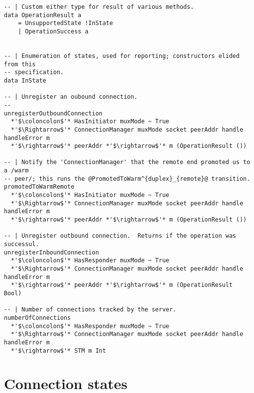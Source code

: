 \documentclass{article}
\begin{document}
\begin{lstlisting}
-- | Custom either type for result of various methods.
data OperationResult a
    = UnsupportedState !InState
    | OperationSuccess a


-- | Enumeration of states, used for reporting; constructors elided from this
-- specification.
data InState

-- | Unregister an oubound connection.
-- 
unregisterOutboundConnection
  *'$\coloncolon$'* HasInitiator muxMode ~ True
  *'$\Rightarrow$'* ConnectionManager muxMode socket peerAddr handle handleError m
  *'$\rightarrow$'* peerAddr *'$\rightarrow$'* m (OperationResult ())

-- | Notify the 'ConnectionManager' that the remote end promoted us to a /warm
-- peer/; this runs the @PromotedToWarm^{duplex}_{remote}@ transition.
promotedToWarmRemote
  *'$\coloncolon$'* HasInitiator muxMode ~ True
  *'$\Rightarrow$'* ConnectionManager muxMode socket peerAddr handle handleError m
  *'$\rightarrow$'* peerAddr *'$\rightarrow$'* m (OperationResult ())

-- | Unregister outbound connection.  Returns if the operation was successul.
unregisterInboundConnection
  *'$\coloncolon$'* HasResponder muxMode ~ True
  *'$\Rightarrow$'* ConnectionManager muxMode socket peerAddr handle handleError m
  *'$\rightarrow$'* peerAddr *'$\rightarrow$'* m (OperationResult Bool)

-- | Number of connections tracked by the server.
numberOfConnections
  *'$\coloncolon$'* HasResponder muxMode ~ True
  *'$\Rightarrow$'* ConnectionManager muxMode socket peerAddr handle handleError m
  *'$\rightarrow$'* STM m Int
\end{lstlisting}

\section{Connection states}
\end{document}
